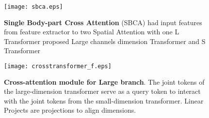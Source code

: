 \documentclass{bmvc2k}
\begin{document}
\begin{figure}[tbp]
  \begin{minipage}[b]{0.48\columnwidth}
    \centering
    \texttt{[image: sbca.eps]}
    \label{fig-sbca}
    \caption{\textbf{Single Body-part Cross Attention} (SBCA) had input features from feature extractor to two Spatial Attention with one L Transformer proposed Large channels dimension Transformer and S Transformer }
  \end{minipage}
  \hspace{0.02\columnwidth} \begin{minipage}[b]{0.48\columnwidth}
    \centering
    \texttt{[image: crosstransformer\_f.eps]}
    \label{fig-cross}
    \caption{\textbf{Cross-attention module for Large branch}. The joint tokens of the large-dimension transformer serve as a query token to interact with the joint tokens from the small-dimension transformer. Linear Projects are projections to align dimensions.}
  \end{minipage}
\end{figure}
\end{document}
